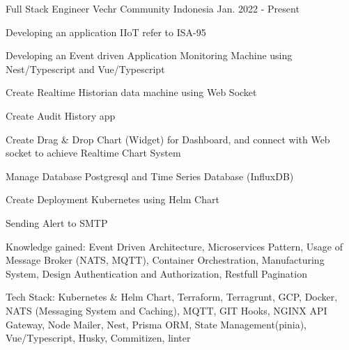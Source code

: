 

\begin{cventries}


  \cventry
    {Full Stack Engineer} %
    {Vechr Community} %
    {Indonesia} %
    {Jan. 2022 - Present} %
    {
      \begin{cvitems} %
        \item {Developing an application IIoT refer to ISA-95}
        \item {Developing an Event driven Application Monitoring Machine using Nest/Typescript and Vue/Typescript}
        \item {Create Realtime Historian data machine using Web Socket}
        \item {Create Audit History app}
        \item {Create Drag \& Drop Chart (Widget) for Dashboard, and connect with Web socket to achieve Realtime Chart System}
        \item {Manage Database Postgresql and Time Series Database (InfluxDB)}
        \item {Create Deployment Kubernetes using Helm Chart}
        \item {Sending Alert to SMTP}
        \item {Knowledge gained: Event Driven Architecture, Microservices Pattern, Usage of Message Broker (NATS, MQTT), Container Orchestration, Manufacturing System, Design Authentication and Authorization, Restfull Pagination}
        \item {Tech Stack: Kubernetes \& Helm Chart, Terraform, Terragrunt, GCP, Docker, NATS (Messaging System and Caching), MQTT, GIT Hooks, NGINX API Gateway, Node Mailer, Nest, Prisma ORM, State Management(pinia), Vue/Typescript, Husky, Commitizen, linter}
      \end{cvitems}
    }


\end{cventries}
